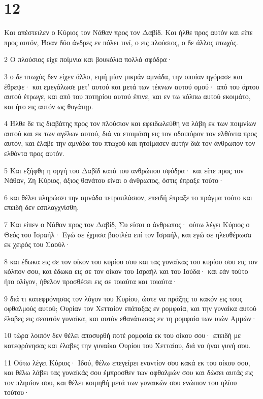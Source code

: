 \chapter{12}

\par Και απέστειλεν ο Κύριος τον Νάθαν προς τον Δαβίδ. Και ήλθε προς αυτόν και είπε προς αυτόν, Ήσαν δύο άνδρες εν πόλει τινί, ο εις πλούσιος, ο δε άλλος πτωχός.
\par 2 Ο πλούσιος είχε ποίμνια και βουκόλια πολλά σφόδρα·
\par 3 ο δε πτωχός δεν είχεν άλλο, ειμή μίαν μικράν αμνάδα, την οποίαν ηγόρασε και έθρεψε· και εμεγάλωσε μετ' αυτού και μετά των τέκνων αυτού ομού· από του άρτου αυτού έτρωγε, και από του ποτηρίου αυτού έπινε, και εν τω κόλπω αυτού εκοιμάτο, και ήτο εις αυτόν ως θυγάτηρ.
\par 4 Ήλθε δε τις διαβάτης προς τον πλούσιον και εφειδωλεύθη να λάβη εκ των ποιμνίων αυτού και εκ των αγέλων αυτού, διά να ετοιμάση εις τον οδοιπόρον τον ελθόντα προς αυτόν, και έλαβε την αμνάδα του πτωχού και ητοίμασεν αυτήν διά τον άνθρωπον τον ελθόντα προς αυτόν.
\par 5 Και εξήφθη η οργή του Δαβίδ κατά του ανθρώπου σφόδρα· και είπε προς τον Νάθαν, Ζη Κύριος, άξιος θανάτου είναι ο άνθρωπος, όστις έπραξε τούτο·
\par 6 και θέλει πληρώσει την αμνάδα τετραπλάσιον, επειδή έπραξε το πράγμα τούτο και επειδή δεν εσπλαγχνίσθη.
\par 7 Και είπεν ο Νάθαν προς τον Δαβίδ, Συ είσαι ο άνθρωπος· ούτω λέγει Κύριος ο Θεός του Ισραήλ· Εγώ σε έχρισα βασιλέα επί τον Ισραήλ, και εγώ σε ηλευθέρωσα εκ χειρός του Σαούλ·
\par 8 και έδωκα εις σε τον οίκον του κυρίου σου και τας γυναίκας του κυρίου σου εις τον κόλπον σου, και έδωκα εις σε τον οίκον του Ισραήλ και του Ιούδα· και εάν τούτο ήτο ολίγον, ήθελον προσθέσει εις σε τοιαύτα και τοιαύτα·
\par 9 διά τι κατεφρόνησας τον λόγον του Κυρίου, ώστε να πράξης το κακόν εις τους οφθαλμούς αυτού; Ουρίαν τον Χετταίον επάταξας εν ρομφαία, και την γυναίκα αυτού έλαβες εις σεαυτόν γυναίκα, και αυτόν εθανάτωσας εν τη ρομφαία των υιών Αμμών·
\par 10 τώρα λοιπόν δεν θέλει αποσυρθή ποτέ ρομφαία εκ του οίκου σου· επειδή με κατεφρόνησας και έλαβες την γυναίκα Ουρίου του Χετταίου, διά να ήναι γυνή σου.
\par 11 Ούτω λέγει Κύριος· Ιδού, θέλω επεγείρει εναντίον σου κακά εκ του οίκου σου, και θέλω λάβει τας γυναίκάς σου έμπροσθεν των οφθαλμών σου και δώσει αυτάς εις τον πλησίον σου, και θέλει κοιμηθή μετά των γυναικών σου ενώπιον του ηλίου τούτου·

